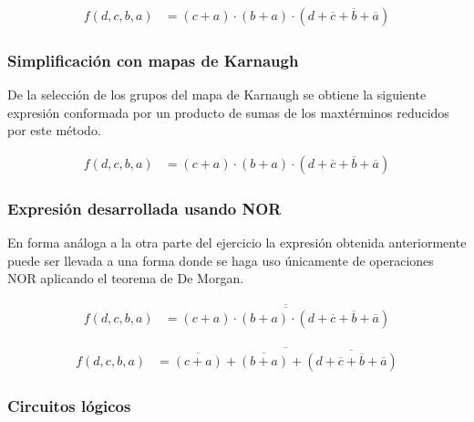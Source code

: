 \begin{equation*}
    \begin{align*}
    f(d,c,b,a) & = {(c+a)}
    \cdot {(b+a)}
    \cdot {(d+\overline{c}+\overline{b}+\overline{a})} 
    \end{align*}
    \end{equation*}

\subsubsection{Simplificación con mapas de Karnaugh}

\begin{figure}[H]
    \centering
    \begin{Karnaugh}
    \end{Karnaugh}
\end{figure}

De la selecci\'on de los grupos del mapa de Karnaugh se obtiene la siguiente expresi\'on conformada por un producto
de sumas de los maxt\'erminos reducidos por este m\'etodo.

\begin{equation*}
\begin{align*}
f(d,c,b,a) & = {(c+a)}
\cdot {(b+a)}
\cdot {(d+\overline{c}+\overline{b}+\overline{a})} 
\end{align*}
\end{equation*}

\subsubsection{Expresión desarrollada usando NOR}
En forma an\'aloga a la otra parte del ejercicio la expresi\'on obtenida anteriormente puede ser llevada a una forma donde se haga
uso \'unicamente de operaciones NOR aplicando el teorema de De Morgan.

\begin{equation*}
\begin{align*}
f(d,c,b,a) & = \overline{
    \overline{
        {(c+a)}
        \cdot {(b+a)}
        \cdot {(d+\overline{c}+\overline{b}+\overline{a})} 
    }
}
\end{align*}
\end{equation*}

\begin{equation*}
\begin{align*}
f(d,c,b,a) & = \overline{
    \overline{(c+a)}
    + \overline{(b+a)}
    + \overline{(d+\overline{c}+\overline{b}+\overline{a})} 
}
\end{align*}
\end{equation*}


\subsubsection{Circuitos lógicos}
